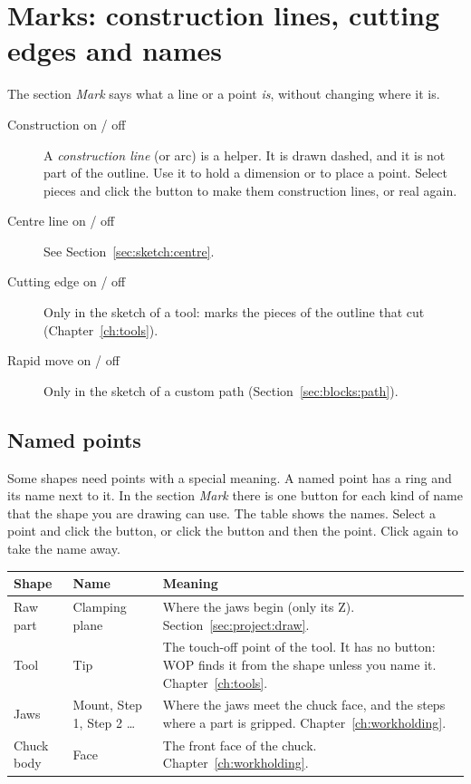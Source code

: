 \section{Marks: construction lines, cutting edges and names}\label{sec:sketch:marks}

The section \emph{Mark} says what a line or a point \emph{is}, without changing where it is.

\begin{description}
\item[Construction on / off] A \emph{construction line} (or arc) is a helper. It is drawn dashed, and it is not part of the outline. Use it to hold a dimension or to place a point. Select pieces and click the button to make them construction lines, or real again.
\item[Centre line on / off] See Section~\ref{sec:sketch:centre}.
\item[Cutting edge on / off] Only in the sketch of a tool: marks the pieces of the outline that cut (Chapter~\ref{ch:tools}).
\item[Rapid move on / off] Only in the sketch of a custom path (Section~\ref{sec:blocks:path}).
\end{description}

\subsection{Named points}\label{sec:sketch:names}
Some shapes need points with a special meaning. A named point has a ring and its name next to it. In the section \emph{Mark} there is one button for each kind of name that the shape you are drawing can use. The table shows the names. Select a point and click the button, or click the button and then the point. Click again to take the name away.

\begin{center}
\begin{tabularx}{\textwidth}{@{}l l Y@{}}
\toprule
\textbf{Shape} & \textbf{Name} & \textbf{Meaning} \\
\midrule
Raw part & Clamping plane & Where the jaws begin (only its Z). Section~\ref{sec:project:draw}. \\
Tool & Tip & The touch-off point of the tool. It has no button: WOP finds it from the shape unless you name it. Chapter~\ref{ch:tools}. \\
Jaws & Mount, Step 1, Step 2 \ldots & Where the jaws meet the chuck face, and the steps where a part is gripped. Chapter~\ref{ch:workholding}. \\
Chuck body & Face & The front face of the chuck. Chapter~\ref{ch:workholding}. \\
\bottomrule
\end{tabularx}
\end{center}

